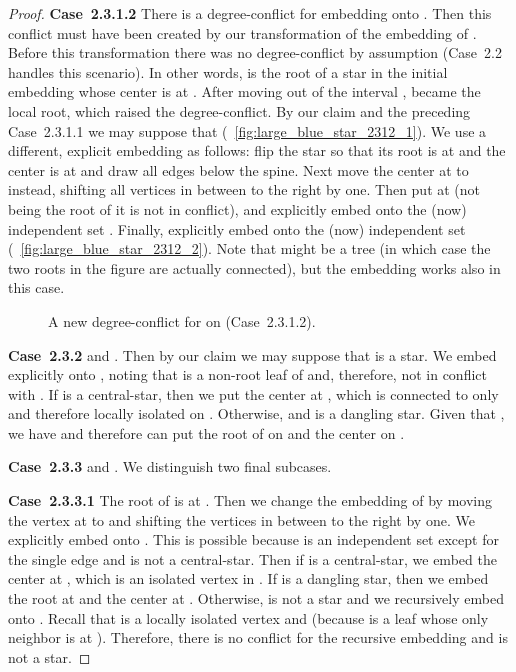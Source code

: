 \documentclass[11pt,a4paper,colorlinks=true,urlcolor=blue,citecolor=red]{article}
\theoremstyle{plain}
\newcommand{\case}[1]{\par\vspace{.5\baselineskip}\noindent\textbf{\sffamily Case~#1}}
\begin{document}
\begin{proof}
  \case{2.3.1.2} There is a degree-conflict for embedding  onto
  . Then this conflict must have been created by our
  transformation of the embedding of . Before this transformation
  there was no degree-conflict by assumption (Case~2.2 handles this
  scenario). In other words,  is the root of a star  in
  the initial embedding whose center is at . After moving  out of
  the interval ,  became the local root, which raised
  the degree-conflict. By our claim and the preceding Case~2.3.1.1 we
  may suppose that 
  (\figurename~\ref{fig:large_blue_star_2312_1}). We use a different,
  explicit embedding as follows: flip the star  so that its
  root is at  and the center is at  and draw all edges below the
  spine. Next move the center at  to  instead, shifting all
  vertices in between to the right by one. Then put  at  (not
  being the root of  it is not in conflict), and explicitly
  embed  onto the (now) independent set . Finally,
  explicitly embed  onto the (now) independent set 
  (\figurename~\ref{fig:large_blue_star_2312_2}). Note that  might be
  a tree (in which case the two roots in the figure are actually
  connected), but the embedding works also in this case.
\begin{figure}[htbp]
    \centering\hfil {}\hfil
    \hfil
    \caption{A new degree-conflict for  on 
      (Case~2.3.1.2).\label{fig:large_blue_star_2312}}
  \end{figure}


  \case{2.3.2}  and . Then by
  our claim we may suppose that  is a star. We embed  explicitly
  onto , noting that  is a non-root leaf of  and,
  therefore, not in conflict with . If  is a central-star, then we
  put the center at , which is connected to  only and therefore
  locally isolated on . Otherwise,  and  is a
  dangling star. Given that , we have  and therefore
  can put the root of  on  and the center on .

  \case{2.3.3}  and . We distinguish
  two final subcases.

  \case{2.3.3.1} The root of  is at . Then we change the
  embedding of  by moving the vertex at  to  and shifting the
  vertices in between to the right by one. We explicitly embed 
  onto . This is possible because  is an
  independent set except for the single edge  and  is
  not a central-star. Then if  is a central-star, we embed
  the center at , which is an isolated vertex in .
  If  is a dangling star, then we embed the root at  and
  the center at . Otherwise,  is not a star and we
  recursively embed  onto . Recall that  is a
  locally isolated vertex and 
  (because  is a leaf whose only neighbor is at ).
  Therefore, there is no conflict for the recursive embedding and
   is not a star.


\end{proof}
\end{document}
